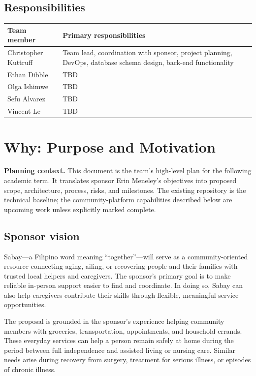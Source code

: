 \documentclass[11pt]{article}
\begin{document}
\subsection{Responsibilities}

\begin{tabularx}{\textwidth}{p{}X}
\toprule
\textbf{Team member} & \textbf{Primary responsibilities} \\
\midrule
Christopher Kuttruff & Team lead, coordination with sponsor, project planning, DevOps, database schema design, back-end functionality \\
Ethan Dibble & TBD \\
Olga Ishimwe & TBD \\
Sefu Alvarez & TBD \\
Vincent Le   & TBD \\
\bottomrule
\end{tabularx}

\section{Why: Purpose and Motivation}

\textbf{Planning context.} This document is the team's high-level plan for the following academic term. It translates sponsor Erin Meneley's objectives into proposed scope, architecture, process, risks, and milestones. The existing repository is the technical baseline; the community-platform capabilities described below are upcoming work unless explicitly marked complete.

\subsection{Sponsor vision}

Sabay---a Filipino word meaning ``together''---will serve as a community-oriented resource connecting aging, ailing, or recovering people and their families with trusted local helpers and caregivers. The sponsor's primary goal is to make reliable in-person support easier to find and coordinate. In doing so, Sabay can also help caregivers contribute their skills through flexible, meaningful service opportunities.

The proposal is grounded in the sponsor's experience helping community members with groceries, transportation, appointments, and household errands. These everyday services can help a person remain safely at home during the period between full independence and assisted living or nursing care. Similar needs arise during recovery from surgery, treatment for serious illness, or episodes of chronic illness.
\end{document}
